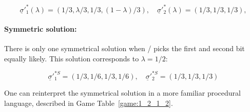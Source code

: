\documentclass{article}
\theoremstyle{definition}
\begin{document}
\begin{equation}
    \label{eq:SimplestFisherComplete}
    \underline{\sigma}'^*_1(\lambda)=(1/3,\lambda/3,1/3,(1-\lambda)/3), \quad \underline{\sigma}'^*_2(\lambda)=(1/3,1/3,1/3), 
\end{equation}

\paragraph{Symmetric solution:}

There is only one symmetrical solution when \PI/ picks the first and second bit equally likely. This solution corresponds to $\lambda=1/2$:

\begin{equation}
    \underline{\sigma}'^{*S}_1=(1/3,1/6,1/3,1/6), \quad 
    \underline{\sigma}'^{*S}_2=(1/3,1/3,1/3)
\end{equation}

One can reinterpret the symmetrical solution in a more familiar procedural language, described in Game Table~\ref{game:1_2_1_2}.
\end{document}
